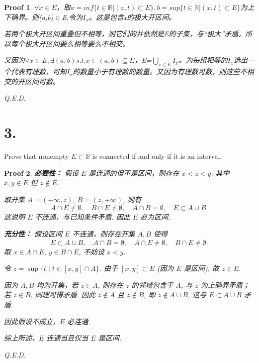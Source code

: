 \documentclass[a4paper,12pt]{article}
\newtheorem*{pf}{Proof}
\begin{document}
\begin{pf}
    $\forall x\in E$，取$a=inf\{t\in\mathbb{R}|(a,t)\subset E\},b=sup\{t\in\mathbb{R}|(x,t)\subset E\}$为上下确界。则(a,b)$\in$E,令为$I_x$。这是包含x的极大开区间。

    若两个极大开区间重叠但不相等，则它们的并依然是E的子集，与“极大”矛盾。所以每个极大开区间要么相等要么不相交。

    又因为$\forall x\in E,\exists (a,b) s.t. x\in(a,b)\subseteq E$，E=$\bigcup_{x\in E}I_x$。为每组相等的$I_x$选出一个代表有理数，可知$I_x$的数量小于有理数的数量。又因为有理数可数，则这些不相交的开区间可数。

    Q.E.D.
\end{pf}

\section*{3.} Prove that nonempty $E \subset \mathbb{R}$ is connected if and only if it is an interval.

\begin{pf}
    \textbf{必要性：} 假设 $E$ 是连通的但不是区间，则存在 $x < z < y$, 其中 $x, y \in E$ 但 $z \notin E$.

    取开集 $A = (-\infty, z)$, $B = (z, +\infty)$, 则有
    $$
        A \cap E \neq \emptyset, \quad B \cap E \neq \emptyset, \quad A \cap B = \emptyset, \quad E \subset A \cup B.
    $$
    这说明 $E$ 不连通，与已知条件矛盾. 因此 $E$ 必为区间.

    \textbf{充分性：} 假设区间 $E$ 不连通，则存在开集 $A, B$ 使得
    $$
        E \subset A \cup B, \quad A \cap B = \emptyset, \quad A \cap E \neq \emptyset, \quad B \cap E \neq \emptyset.
    $$
    取 $x \in A \cap E$, $y \in B \cap E$, 不妨设 $x < y$.

    令 $z = \sup\{t \mid t \in [x, y] \cap A\}$. 由于 $[x, y] \subset E$ (因为 $E$ 是区间), 故 $z \in E$.

    因为 $A, B$ 均为开集，若 $z \in A$, 则存在 $z$ 的邻域包含于 $A$, 与 $z$ 为上确界矛盾；若 $z \in B$, 同理可得矛盾. 因此 $z \notin A$ 且 $z \notin B$, 即 $z \notin A \cup B$, 这与 $E \subset A \cup B$ 矛盾.

    因此假设不成立，$E$ 必连通.

    综上所述，$E$ 连通当且仅当 $E$ 是区间.

    Q.E.D.
\end{pf}
\end{document}
